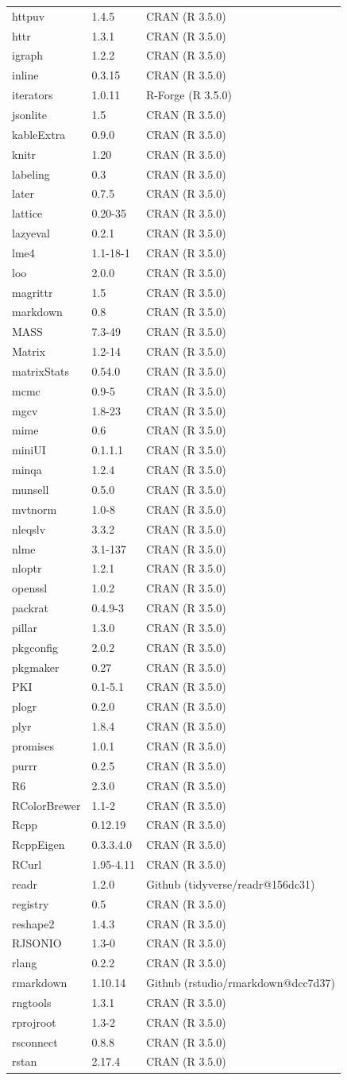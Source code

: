 \documentclass[12pt,a4paper,UTF8,twoside]{book}
\theoremstyle{definition}
\theoremstyle{definition}
\theoremstyle{definition}
\theoremstyle{remark}
\begin{document}
\begin{longtable}[]{@{}lll@{}}
httpuv & 1.4.5 & CRAN (R 3.5.0)\tabularnewline
httr & 1.3.1 & CRAN (R 3.5.0)\tabularnewline
igraph & 1.2.2 & CRAN (R 3.5.0)\tabularnewline
inline & 0.3.15 & CRAN (R 3.5.0)\tabularnewline
iterators & 1.0.11 & R-Forge (R 3.5.0)\tabularnewline
jsonlite & 1.5 & CRAN (R 3.5.0)\tabularnewline
kableExtra & 0.9.0 & CRAN (R 3.5.0)\tabularnewline
knitr & 1.20 & CRAN (R 3.5.0)\tabularnewline
labeling & 0.3 & CRAN (R 3.5.0)\tabularnewline
later & 0.7.5 & CRAN (R 3.5.0)\tabularnewline
lattice & 0.20-35 & CRAN (R 3.5.0)\tabularnewline
lazyeval & 0.2.1 & CRAN (R 3.5.0)\tabularnewline
lme4 & 1.1-18-1 & CRAN (R 3.5.0)\tabularnewline
loo & 2.0.0 & CRAN (R 3.5.0)\tabularnewline
magrittr & 1.5 & CRAN (R 3.5.0)\tabularnewline
markdown & 0.8 & CRAN (R 3.5.0)\tabularnewline
MASS & 7.3-49 & CRAN (R 3.5.0)\tabularnewline
Matrix & 1.2-14 & CRAN (R 3.5.0)\tabularnewline
matrixStats & 0.54.0 & CRAN (R 3.5.0)\tabularnewline
mcmc & 0.9-5 & CRAN (R 3.5.0)\tabularnewline
mgcv & 1.8-23 & CRAN (R 3.5.0)\tabularnewline
mime & 0.6 & CRAN (R 3.5.0)\tabularnewline
miniUI & 0.1.1.1 & CRAN (R 3.5.0)\tabularnewline
minqa & 1.2.4 & CRAN (R 3.5.0)\tabularnewline
munsell & 0.5.0 & CRAN (R 3.5.0)\tabularnewline
mvtnorm & 1.0-8 & CRAN (R 3.5.0)\tabularnewline
nleqslv & 3.3.2 & CRAN (R 3.5.0)\tabularnewline
nlme & 3.1-137 & CRAN (R 3.5.0)\tabularnewline
nloptr & 1.2.1 & CRAN (R 3.5.0)\tabularnewline
openssl & 1.0.2 & CRAN (R 3.5.0)\tabularnewline
packrat & 0.4.9-3 & CRAN (R 3.5.0)\tabularnewline
pillar & 1.3.0 & CRAN (R 3.5.0)\tabularnewline
pkgconfig & 2.0.2 & CRAN (R 3.5.0)\tabularnewline
pkgmaker & 0.27 & CRAN (R 3.5.0)\tabularnewline
PKI & 0.1-5.1 & CRAN (R 3.5.0)\tabularnewline
plogr & 0.2.0 & CRAN (R 3.5.0)\tabularnewline
plyr & 1.8.4 & CRAN (R 3.5.0)\tabularnewline
promises & 1.0.1 & CRAN (R 3.5.0)\tabularnewline
purrr & 0.2.5 & CRAN (R 3.5.0)\tabularnewline
R6 & 2.3.0 & CRAN (R 3.5.0)\tabularnewline
RColorBrewer & 1.1-2 & CRAN (R 3.5.0)\tabularnewline
Rcpp & 0.12.19 & CRAN (R 3.5.0)\tabularnewline
RcppEigen & 0.3.3.4.0 & CRAN (R 3.5.0)\tabularnewline
RCurl & 1.95-4.11 & CRAN (R 3.5.0)\tabularnewline
readr & 1.2.0 & Github (tidyverse/readr@156dc31)\tabularnewline
registry & 0.5 & CRAN (R 3.5.0)\tabularnewline
reshape2 & 1.4.3 & CRAN (R 3.5.0)\tabularnewline
RJSONIO & 1.3-0 & CRAN (R 3.5.0)\tabularnewline
rlang & 0.2.2 & CRAN (R 3.5.0)\tabularnewline
rmarkdown & 1.10.14 & Github (rstudio/rmarkdown@dcc7d37)\tabularnewline
rngtools & 1.3.1 & CRAN (R 3.5.0)\tabularnewline
rprojroot & 1.3-2 & CRAN (R 3.5.0)\tabularnewline
rsconnect & 0.8.8 & CRAN (R 3.5.0)\tabularnewline
rstan & 2.17.4 & CRAN (R 3.5.0)\tabularnewline

\end{longtable}
\end{document}
